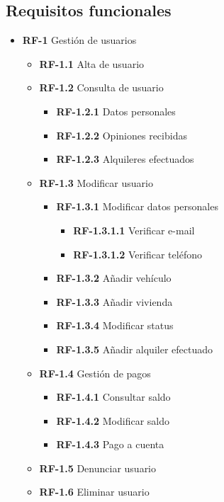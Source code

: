 \documentclass[11pt,spanish]{article} %
\begin{document}
\subsection{Requisitos funcionales}
\begin{itemize}
	\item \textbf{RF-1} Gestión de usuarios
	\begin{itemize}
		\item \textbf{RF-1.1} Alta de usuario
		\item \textbf{RF-1.2} Consulta de usuario
		\begin{itemize}
			\item \textbf{RF-1.2.1} Datos personales
			\item \textbf{RF-1.2.2} Opiniones recibidas
			\item \textbf{RF-1.2.3} Alquileres efectuados
		\end{itemize}
		\item \textbf{RF-1.3} Modificar usuario
		\begin{itemize}
			\item \textbf{RF-1.3.1} Modificar datos personales
			\begin{itemize}
				\item \textbf{RF-1.3.1.1} Verificar e-mail
				\item \textbf{RF-1.3.1.2} Verificar teléfono
			\end{itemize}
			\item \textbf{RF-1.3.2} Añadir vehículo
			\item \textbf{RF-1.3.3} Añadir vivienda
			\item \textbf{RF-1.3.4} Modificar status
			\item \textbf{RF-1.3.5} Añadir alquiler efectuado
		\end{itemize}
		\item \textbf{RF-1.4} Gestión de pagos
		\begin{itemize}
			\item \textbf{RF-1.4.1} Consultar saldo
			\item \textbf{RF-1.4.2} Modificar saldo
			\item \textbf{RF-1.4.3} Pago a cuenta
		\end{itemize}
		\item \textbf{RF-1.5} Denunciar usuario
		\item \textbf{RF-1.6} Eliminar usuario
	\end{itemize}
	

\end{itemize}
\end{document}
